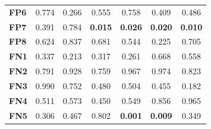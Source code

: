 \begin{table}
\begin{tabular}{lccc|ccc}
        \textbf{FP6}  & 0.774                                   & 0.266                                             & 0.555                                  & 0.758                                    & 0.409                                  & 0.486                                  \\
        \textbf{FP7}  & 0.391                                   & 0.784                                             & \cellcolor[HTML]{EFEFEF}\textbf{0.015} & \cellcolor[HTML]{EFEFEF}\textbf{0.026}   & \cellcolor[HTML]{EFEFEF}\textbf{0.020} & \cellcolor[HTML]{EFEFEF}\textbf{0.010} \\
        \textbf{FP8}  & 0.624                                   & 0.837                                             & 0.681                                  & 0.544                                    & 0.225                                  & 0.705                                  \\
        \textbf{FN1}  & 0.337                                   & 0.213                                             & 0.317                                  & 0.261                                    & 0.668                                  & 0.558                                  \\
        \textbf{FN2}  & 0.791                                   & 0.928                                             & 0.759                                  & 0.967                                    & 0.974                                  & 0.823                                  \\
        \textbf{FN3}  & 0.990                                   & 0.752                                             & 0.480                                  & 0.504                                    & 0.455                                  & 0.182                                  \\
        \textbf{FN4}  & 0.511                                   & 0.573                                             & 0.450                                  & 0.549                                    & 0.856                                  & 0.965                                  \\
        \textbf{FN5}  & 0.306                                   & 0.467                                             & 0.802                                  & \cellcolor[HTML]{EFEFEF}\textbf{0.001}   & \cellcolor[HTML]{EFEFEF}\textbf{0.009} & 0.349                                  \\

\end{tabular}
\end{table}
